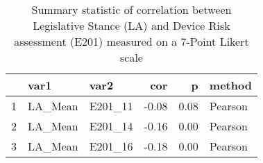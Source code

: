 \begin{table}[ht]
\centering
\begin{tabular}{rllrrl}
  \hline
 & var1 & var2 & cor & p & method \\ 
  \hline
1 & LA\_Mean & E201\_11 & -0.08 & 0.08 & Pearson \\ 
  2 & LA\_Mean & E201\_14 & -0.16 & 0.00 & Pearson \\ 
  3 & LA\_Mean & E201\_16 & -0.18 & 0.00 & Pearson \\ 
   \hline
\end{tabular}
\caption{Summary statistic of correlation between Legislative Stance (LA) and Device Risk assessment (E201) measured on a 7-Point Likert scale} 
\end{table}
